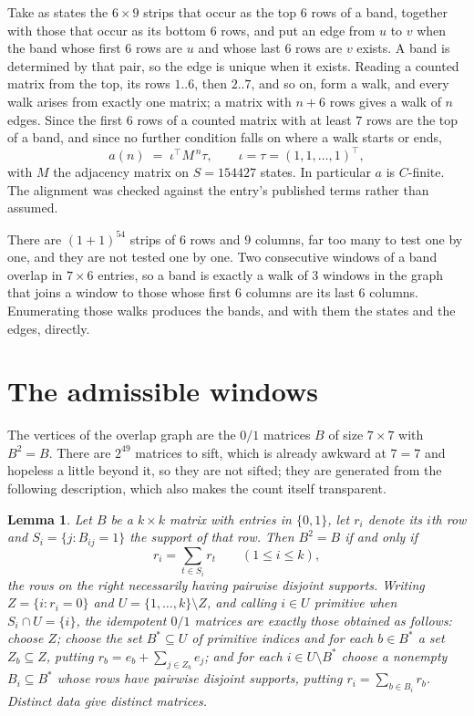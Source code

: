 \documentclass[11pt,a4paper]{article}
\theoremstyle{plain}
\newtheorem{lemma}[theorem]{Lemma}
\theoremstyle{definition}
\begin{document}
Take as states the $6\times9$ strips that occur as the top $6$ rows of a band,
together with those that occur as its bottom $6$ rows, and put an edge from $u$ to $v$
when the band whose first $6$ rows are $u$ and whose last $6$ rows are $v$ exists.
A band is determined by that pair, so the edge is unique when it exists. Reading a counted
matrix from the top, its rows $1..6$, then $2..7$, and so on, form a walk, and every
walk arises from exactly one matrix; a matrix with $n+6$ rows gives a walk of $n$ edges.
Since the first $6$ rows of a counted matrix with at least $7$ rows are the top of a
band, and since no further condition falls on where a walk starts or ends,
\[
a(n)\;=\;\iota^{\!\top}M^{\,n}\tau ,\qquad \iota=\tau=(1,1,\dots,1)^{\!\top},
\]
with $M$ the adjacency matrix on $S=154427$ states. In particular $a$ is $C$-finite. The
alignment was checked against the entry's published terms rather than assumed.

There are $(1 + 1)^{54}$ strips of $6$ rows and $9$ columns, far too
many to test one by one, and they are not tested one by one. Two consecutive windows of a band
overlap in $7\times6$ entries, so a band is exactly a walk of $3$ windows in
the graph that joins a window to those whose first $6$ columns are its last $6$
columns. Enumerating those walks produces the bands, and with them the states and the edges,
directly.

\section{The admissible windows}

The vertices of the overlap graph are the $0/1$ matrices $B$ of size $7\times7$ with
$B^2=B$. There are $2^{49}$ matrices to sift, which is already awkward at $7=7$ and
hopeless a little beyond it, so they are not sifted; they are generated from the following
description, which also makes the count itself transparent.

\begin{lemma}\label{lem:idem}
Let $B$ be a $k\times k$ matrix with entries in $\{0,1\}$, let $r_i$ denote its $i$th row and
$S_i=\{j:B_{ij}=1\}$ the support of that row. Then $B^2=B$ if and only if
\[
r_i=\sum_{t\in S_i}r_t \qquad (1\le i\le k),
\]
the rows on the right necessarily having pairwise disjoint supports. Writing
$Z=\{i:r_i=0\}$ and $U=\{1,\dots,k\}\setminus Z$, and calling $i\in U$ \emph{primitive}
when $S_i\cap U=\{i\}$, the idempotent $0/1$ matrices are exactly those obtained as follows:
choose $Z$; choose the set $B^{\ast}\subseteq U$ of primitive indices and for each
$b\in B^{\ast}$ a set $Z_b\subseteq Z$, putting $r_b=e_b+\sum_{j\in Z_b}e_j$; and for each
$i\in U\setminus B^{\ast}$ choose a nonempty $B_i\subseteq B^{\ast}$ whose rows have
pairwise disjoint supports, putting $r_i=\sum_{b\in B_i}r_b$. Distinct data give distinct
matrices.
\end{lemma}
\end{document}
